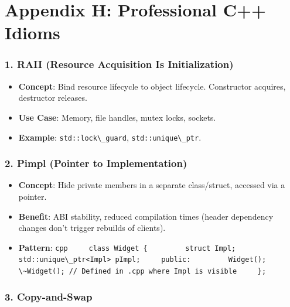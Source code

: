 \hypertarget{appendix-h-professional-c-idioms}{%
\section{Appendix H: Professional C++
Idioms}\label{appendix-h-professional-c-idioms}}

\hypertarget{raii-resource-acquisition-is-initialization}{%
\subsubsection{1. RAII (Resource Acquisition Is
Initialization)}\label{raii-resource-acquisition-is-initialization}}

\begin{itemize}
\tightlist
\item
  \textbf{Concept}: Bind resource lifecycle to object lifecycle.
  Constructor acquires, destructor releases.
\item
  \textbf{Use Case}: Memory, file handles, mutex locks, sockets.
\item
  \textbf{Example}: \passthrough{\lstinline!std::lock\_guard!},
  \passthrough{\lstinline!std::unique\_ptr!}.
\end{itemize}

\hypertarget{pimpl-pointer-to-implementation}{%
\subsubsection{2. Pimpl (Pointer to
Implementation)}\label{pimpl-pointer-to-implementation}}

\begin{itemize}
\tightlist
\item
  \textbf{Concept}: Hide private members in a separate class/struct,
  accessed via a pointer.
\item
  \textbf{Benefit}: ABI stability, reduced compilation times (header
  dependency changes don't trigger rebuilds of clients).
\item
  \textbf{Pattern}:
  \passthrough{\lstinline!cpp     class Widget \{         struct Impl;         std::unique\_ptr<Impl> pImpl;     public:         Widget();         \~Widget(); // Defined in .cpp where Impl is visible     \};!}
\end{itemize}

\hypertarget{copy-and-swap}{%
\subsubsection{3. Copy-and-Swap}\label{copy-and-swap}}

